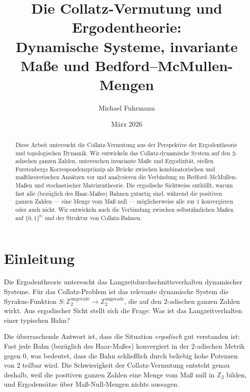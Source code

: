\documentclass[12pt,a4paper]{article}
\begin{document}
\title{Die Collatz-Vermutung und Ergodentheorie:\\
Dynamische Systeme, invariante Maße und Bedford--McMullen-Mengen}
\author{Michael Fuhrmann}
\date{März 2026}
\maketitle

\begin{abstract}
Diese Arbeit untersucht die Collatz-Vermutung aus der Perspektive der Ergodentheorie
und topologischen Dynamik. Wir entwickeln das Collatz-dynamische System auf den
2-adischen ganzen Zahlen, untersuchen invariante Maße und Ergodizität, stellen
Furstenbergs Korrespondenzprinzip als Brücke zwischen kombinatorischen und
maßtheoretischen Ansätzen vor und analysieren die Verbindung zu Bedford--McMullen-Maßen
und stochastischer Matrizentheorie. Die ergodische Sichtweise enthüllt, warum fast alle
(bezüglich des Haar-Maßes) Bahnen gutartig sind, während die positiven ganzen Zahlen ---
eine Menge vom Maß null --- möglicherweise alle zur 1 konvergieren oder auch nicht.
Wir entwickeln auch die Verbindung zwischen selbstähnlichen Maßen auf $\{0,1\}^\mathbb{N}$
und der Struktur von Collatz-Bahnen.
\end{abstract}

\tableofcontents

\newpage

\section{Einleitung}

Die Ergodentheorie untersucht das Langzeitdurchschnittsverhalten dynamischer Systeme.
Für das Collatz-Problem ist das relevante dynamische System die Syrakus-Funktion
$S\colon \mathbb{Z}_2^{\text{ungerade}} \to \mathbb{Z}_2^{\text{ungerade}}$, die auf
den 2-adischen ganzen Zahlen wirkt. Aus ergodischer Sicht stellt sich die Frage: Was
ist das Langzeitverhalten einer typischen Bahn?

Die überraschende Antwort ist, dass die Situation \emph{ergodisch} gut verstanden ist:
Fast jede Bahn (bezüglich des Haar-Maßes) konvergiert in der 2-adischen Metrik gegen 0,
was bedeutet, dass die Bahn schließlich durch beliebig hohe Potenzen von 2 teilbar wird.
Die Schwierigkeit der Collatz-Vermutung entsteht genau deshalb, weil die positiven ganzen
Zahlen eine Menge vom Maß null in $\mathbb{Z}_2$ bilden, und Ergodensätze über
Maß-Null-Mengen nichts aussagen.
\end{document}
